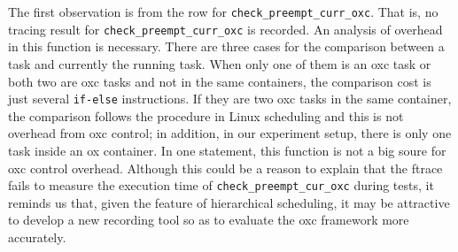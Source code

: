 The first observation is from the row for 
\texttt{check\_preempt\_curr\_oxc}. That is, no tracing result for 
\texttt{check\_preempt\_curr\_oxc} is recorded.
An analysis of overhead in this function is necessary.
There are three cases for the comparison between a task and currently 
the running task. When only one of them is an oxc
task or both two are oxc tasks and not in the same containers, the comparison 
cost is just several \texttt{if-else} instructions. If they are two oxc tasks
in the same container, the comparison follows the procedure in Linux scheduling
and this is not overhead from oxc control; in addition, in our experiment 
setup, there is only one task inside an ox container.
In one statement, this function is not a big soure for oxc control overhead. 
Although this could be a reason to explain that the ftrace fails to measure
the execution time of \texttt{check\_preempt\_cur\_oxc} during tests, it reminds
us that, given the feature of hierarchical scheduling, it may be attractive to
develop a new recording tool so as to evaluate the oxc framework more accurately.
 
